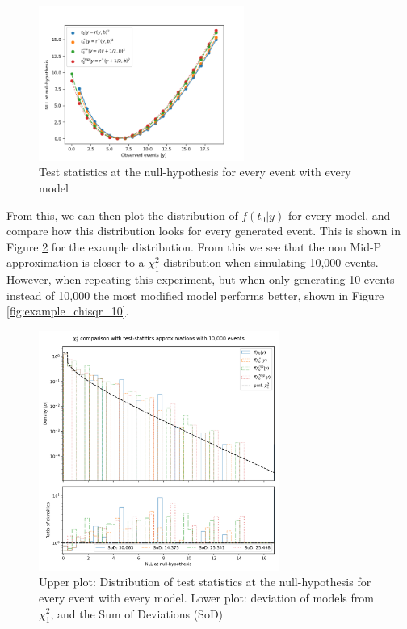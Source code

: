 \documentclass[14pt, a4paper]{article}  %
\begin{document}
\clearpage
\begin{figure}[!ht]
	\centering
        \includegraphics[width=0.6\textwidth]{Poisson_approx/image.png}\caption{Test statistics at the null-hypothesis for every event with every model}\label{fig:example_nll0}
\end{figure} 
From this, we can then plot the distribution of $f(t_0|y)$ for every model, and compare how this distribution looks for every generated event. This is shown in Figure \ref{fig:example_chisqr} for the example distribution. From this we see that the non Mid-P approximation is closer to a $\chi^2_1$ distribution when simulating 10,000 events. However, when repeating this experiment, but when only generating 10 events instead of 10,000 the most modified model performs better, shown in Figure \ref{fig:example_chisqr_10}.
\begin{figure}[!ht]
	\centering
        \includegraphics[width=0.7\textwidth]{Poisson_approx/NLL_densities_10k.png}\caption{Upper plot: Distribution of test statistics at the null-hypothesis for every event with every model. Lower plot: deviation of models from $\chi^2_1$, and the Sum of Deviations (SoD) }\label{fig:example_chisqr}
\end{figure} 
\end{document}
